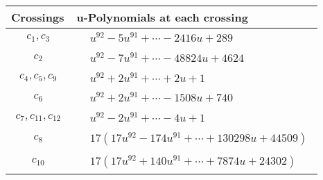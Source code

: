 \documentclass[1p]{elsarticle_modified}
\theoremstyle{definition}
\begin{document}
\begin{tabular}{m{50pt}|m{274pt}}
Crossings & \hspace{64pt}u-Polynomials at each crossing \\
\hline $$\begin{aligned}c_{1},c_{3}\end{aligned}$$&$\begin{aligned}
&u^{92}-5 u^{91}+\cdots-2416 u+289
\end{aligned}$\\
\hline $$\begin{aligned}c_{2}\end{aligned}$$&$\begin{aligned}
&u^{92}-7 u^{91}+\cdots-48824 u+4624
\end{aligned}$\\
\hline $$\begin{aligned}c_{4},c_{5},c_{9}\end{aligned}$$&$\begin{aligned}
&u^{92}+2 u^{91}+\cdots+2 u+1
\end{aligned}$\\
\hline $$\begin{aligned}c_{6}\end{aligned}$$&$\begin{aligned}
&u^{92}+2 u^{91}+\cdots-1508 u+740
\end{aligned}$\\
\hline $$\begin{aligned}c_{7},c_{11},c_{12}\end{aligned}$$&$\begin{aligned}
&u^{92}-2 u^{91}+\cdots-4 u+1
\end{aligned}$\\
\hline $$\begin{aligned}c_{8}\end{aligned}$$&$\begin{aligned}
&17(17 u^{92}-174 u^{91}+\cdots+130298 u+44509)
\end{aligned}$\\
\hline $$\begin{aligned}c_{10}\end{aligned}$$&$\begin{aligned}
&17(17 u^{92}+140 u^{91}+\cdots+7874 u+24302)
\end{aligned}$\\
\hline
\end{tabular}\\~\\
\end{document}
